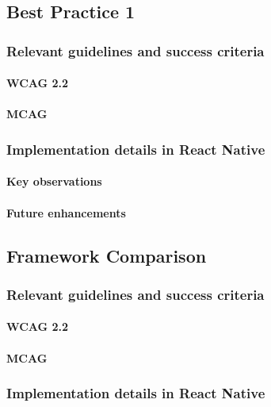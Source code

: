 \subsection{Best Practice 1}

\subsubsection{Relevant guidelines and success criteria}

\paragraph{WCAG 2.2}

\paragraph{MCAG}

\subsubsection{Implementation details in React Native}

\paragraph{Key observations}

\paragraph{Future enhancements}

\subsection{Framework Comparison}

\subsubsection{Relevant guidelines and success criteria}

\paragraph{WCAG 2.2}

\paragraph{MCAG}

\subsubsection{Implementation details in React Native}

